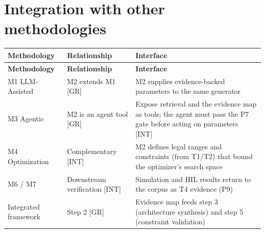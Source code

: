 \documentclass[11pt,a4paper]{article}
\newcommand{\prov}[1]{\textsf{\footnotesize[#1]}}
\begin{document}
\section{Integration with other methodologies}
{\small
\begin{longtable}{>{\raggedright\arraybackslash}p{}>{\raggedright\arraybackslash}p{}>{\raggedright\arraybackslash}p{}}
\toprule
\rowcolor{headbg} \textbf{Methodology} & \textbf{Relationship} & \textbf{Interface} \\
\midrule
\endfirsthead
\toprule
\rowcolor{headbg} \textbf{Methodology} & \textbf{Relationship} & \textbf{Interface} \\
\midrule
\endhead
\bottomrule
\endlastfoot
M1 LLM-Assisted & M2 extends M1 \prov{GR} & M2 supplies evidence-backed parameters to the same generator \\ \arrayrulecolor{rulec}\hline\arrayrulecolor{black}
M3 Agentic & M2 is an agent tool \prov{GR} & Expose retrieval and the evidence map as tools; the agent must pass the P7 gate before acting on parameters \prov{INT} \\ \arrayrulecolor{rulec}\hline\arrayrulecolor{black}
M4 Optimization & Complementary \prov{INT} & M2 defines legal ranges and constraints (from T1/T2) that bound the optimizer's search space \\ \arrayrulecolor{rulec}\hline\arrayrulecolor{black}
M6 / M7 & Downstream verification \prov{INT} & Simulation and HIL results return to the corpus as T4 evidence (P9) \\ \arrayrulecolor{rulec}\hline\arrayrulecolor{black}
Integrated framework & Step 2 \prov{GR} & Evidence map feeds step 3 (architecture synthesis) and step 5 (constraint validation) \\
\end{longtable}
}
\end{document}
